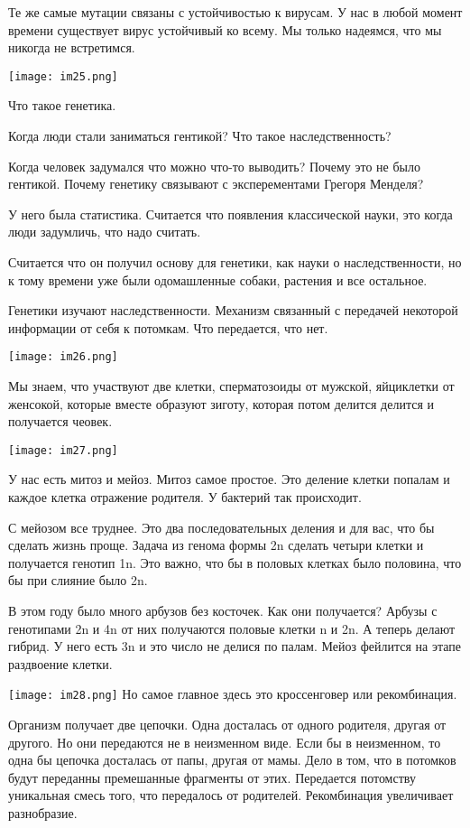 Те же самые мутации связаны с устойчивостью к вирусам. У нас в любой момент 
времени существует вирус устойчивый ко всему. Мы только надеямся, что мы никогда не встретимся. 

\texttt{[image: im25.png]}

Что такое генетика. 

Когда люди стали заниматься гентикой? 
Что такое наследственность?

Когда человек задумался что можно что-то выводить? Почему 
это не было гентикой. Почему генетику связывают с эксперементами Грегоря Менделя? 

У него была статистика. Считается что появления классической науки, это
когда люди задумличь, что надо считать. 

Считается что он получил основу для генетики, как науки о наследственности, 
но к тому времени уже были одомашленные собаки, растения и все остальное. 

Генетики изучают наследственности. Механизм связанный с передачей некоторой информации
от себя к потомкам. Что передается, что нет.
 
\texttt{[image: im26.png]}

Мы знаем, что участвуют две клетки, сперматозоиды от мужской, 
яйциклетки от женсокой, которые вместе образуют зиготу, которая потом 
делится делится и получается чеовек. 


\texttt{[image: im27.png]}

У нас есть митоз и мейоз. Митоз самое простое. Это 
деление клетки попалам и каждое клетка 
отражение родителя. У бактерий так происходит. 

С мейозом все труднее. Это два последовательных деления и для вас, 
что бы сделать жизнь проще. Задача из генома формы 2n 
сделать четыри клетки и получается генотип 1n. Это
важно, что бы в половых клетках было половина, что
бы при слияние было 2n.

В этом году было много арбузов без косточек.
Как они получается? Арбузы с генотипами 2n и 4n от
них получаются половые клетки n и 2n. А теперь
делают гибрид. У него есть 3n и это число не делися по палам.
Мейоз фейлится на этапе раздвоение клетки.   


\texttt{[image: im28.png]}
Но самое главное здесь это кроссенговер или рекомбинация. 

Организм получает две цепочки. Одна досталась от одного родителя,
другая от другого. Но они передаются не в неизменном виде. Если бы 
в неизменном, то одна бы цепочка досталась от папы, другая от мамы. 
Дело в том, что в потомков будут переданны премешанные фрагменты от 
этих. Передается потомству уникальная смесь того, что передалось от родителей. 
Рекомбинация увеличивает разнобразие. 

